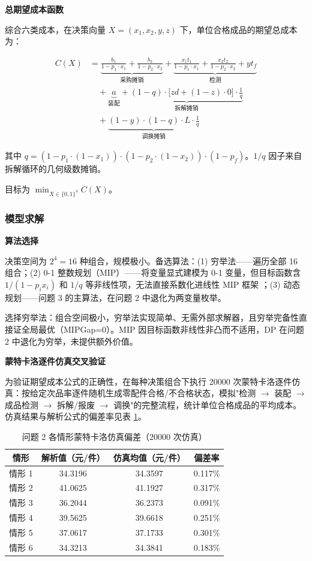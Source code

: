 \documentclass[12pt,a4paper]{ctexart}
\begin{document}
\textbf{总期望成本函数}

综合六类成本，在决策向量 $X=(x_1,x_2,y,z)$ 下，单位合格成品的期望总成本为：

\begin{equation}
\begin{aligned}
C(X) &= \underbrace{\frac{b_1}{1-p_1\cdot x_1} + \frac{b_2}{1-p_2\cdot x_2}}_{\text{采购摊销}} 
+ \underbrace{\frac{x_1 t_1}{1-p_1\cdot x_1} + \frac{x_2 t_2}{1-p_2\cdot x_2} + y t_f}_{\text{检测}} \\
&\quad + \underbrace{a}_{\text{装配}} 
+ \underbrace{(1-q)\cdot \bigl[z d + (1-z)\cdot 0\bigr] \cdot \frac{1}{q}}_{\text{拆解摊销}} \\
&\quad + \underbrace{(1-y)\cdot (1-q)\cdot L \cdot \frac{1}{q}}_{\text{调换摊销}}
\end{aligned}
\label{eq:q2_cost}
\end{equation}

其中 $q = (1-p_1\cdot(1-x_1))\cdot(1-p_2\cdot(1-x_2))\cdot(1-p_f)$。$1/q$ 因子来自拆解循环的几何级数摊销。

目标为 $\min_{X\in\{0,1\}^4} C(X)$。

\subsubsection{模型求解}

\textbf{算法选择}

决策空间为 $2^4=16$ 种组合，规模极小。备选算法：(1) 穷举法——遍历全部 16 组合；(2) 0-1 整数规划（MIP）——将变量显式建模为 0-1 变量，但目标函数含 $1/(1-p_i x_i)$ 和 $1/q$ 等非线性项，无法直接系数化进线性 MIP 框架 \cite{ref5}；(3) 动态规划——问题 3 的主算法，在问题 2 中退化为两变量枚举。

选择穷举法：组合空间极小，穷举法实现简单、无需外部求解器，且穷举完备性直接证全局最优（MIPGap=0）。MIP 因目标函数非线性非凸而不适用，DP 在问题 2 中退化为穷举，未提供额外价值。

\textbf{蒙特卡洛逐件仿真交叉验证}

为验证期望成本公式的正确性，在每种决策组合下执行 20000 次蒙特卡洛逐件仿真：按给定次品率逐件随机生成零配件合格/不合格状态，模拟"检测 $\to$ 装配 $\to$ 成品检测 $\to$ 拆解/报废 $\to$ 调换"的完整流程，统计单位合格成品的平均成本。仿真结果与解析公式的偏差率见表 \ref{tab:q2_mc}。

\begin{table}[H]
\centering
\caption{问题 2 各情形蒙特卡洛仿真偏差（20000 次仿真）}
\label{tab:q2_mc}
\begin{tabular}{cccc}
\toprule
情形 & 解析值（元/件） & 仿真均值（元/件） & 偏差率 \\
\midrule
情形 1 & 34.3196 & 34.3597 & 0.117\% \\
情形 2 & 41.0625 & 41.1927 & 0.317\% \\
情形 3 & 36.2044 & 36.2373 & 0.091\% \\
情形 4 & 39.5625 & 39.6618 & 0.251\% \\
情形 5 & 37.0617 & 37.1733 & 0.301\% \\
情形 6 & 34.3213 & 34.3841 & 0.183\% \\
\bottomrule
\end{tabular}
\end{table}
\end{document}
